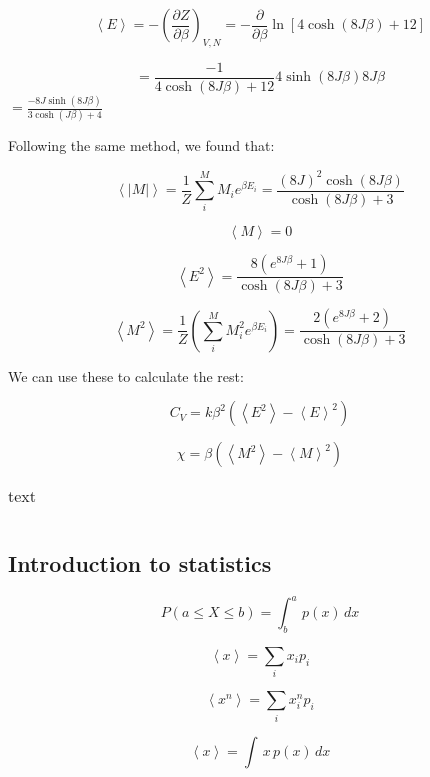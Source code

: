 \[
\left< E\right> = -\left(\frac{\partial Z}{\partial \beta} \right)_{V,N} = - \frac{\partial}{\partial \beta} \ln \left[ 4 \cosh \left( 8J\beta\right)+12\right]
\]

\[
= \frac{-1}{4\cosh (8J\beta) + 12}4 \sinh(8J\beta)8J\beta
\]
$
= \frac{-8J \sinh(8J\beta)}{3\cosh(J\beta)+ 4}
$

Following the same method, we found that:

\[
\left< |M| \right> = \frac{1}{Z} \sum_i^M M_i e^{\beta E_i}  = \frac{(8J)^2 \cosh(8J\beta )}{\cosh (8J\beta ) + 3}
\]

\[
\left< M \right> = 0
\]

\[
\left< E^2 \right> = \frac{8 \left( e^{8J\beta } + 1\right) }{\cosh (8J\beta ) + 3}
\]


\[
\left< M^2 \right> = \frac{1}{Z} \left( \sum_i^M M_i^2 e^{\beta E_i}\right) = \frac{2 \left( e^{8J\beta } + 2\right) }{\cosh (8J\beta ) + 3}
\]

We can use these to calculate the rest:

\[
C_V = k \beta^2\left( \left< E^2\right> - \left< E\right>^2 \right)
\]

\[
\chi = \beta \left( \left< M^2\right> - \left< M\right>^2\right)
\]

\begin{table}[H]
	\caption{text}
	\label{tab: makro}
\begin{tabular}{cccccc}
	
\end{tabular}
\end{table}





\subsection{Introduction to statistics}

\begin{equation}\label{eq:probability_density}
P(a\leq X \leq b) = \int_b^a\, p(x)\, dx
\end{equation}

\begin{equation}\label{eq:expectation_value}
\left< x \right> = \sum\limits_{i} x_ip_i
\end{equation}

\begin{equation}\label{eq:moment}
\left< x^n \right> = \sum\limits_{i} x_i^n p_i
\end{equation}

\begin{equation}\label{eq:mean_value}
\left< x \right> = \int \,x \,p(x)\,dx
\end{equation}
